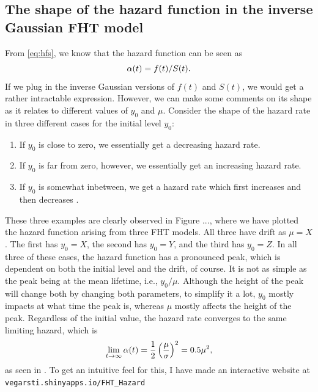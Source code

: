 \subsection{The shape of the hazard function in the inverse Gaussian FHT model}
From \eqref{eq:hfs}, we know that the hazard function can be seen as
\begin{equation*}
    \alpha(t)=f(t)/S(t).
\end{equation*}
If we plug in the inverse Gaussian versions of $f(t)$ and $S(t)$, we would get a rather intractable expression.
However, we can make some comments on its shape as it relates to different values of $y_0$ and $\mu$.
Consider the shape of the hazard rate in three different cases for the initial level $y_0$:
\begin{enumerate}
    \item
        If $y_0$ is close to zero, we essentially get a decreasing hazard rate.
    \item
        If $y_0$ is far from zero, however, we essentially get an increasing hazard rate.
    \item
        If $y_0$ is somewhat inbetween, we get a hazard rate which first increases and then decreases \citep{ABG}.
\end{enumerate}
These three examples are clearly observed in Figure ..., where we have plotted the hazard function arising from three FHT models.
All three have drift as $\mu=X$.
The first has $y_0=X$, the second has $y_0=Y$, and the third has $y_0=Z$.
In all three of these cases, the hazard function has a pronounced peak, which is dependent on both the initial level and the drift, of course. 
It is not as simple as the peak being at the mean lifetime, i.e., $y_0/\mu$.
Although the height of the peak will change both by changing both parameters, to simplify it a lot, $y_0$ mostly impacts at what time the
peak is, whereas $\mu$ mostly affects the height of the peak.
Regardless of the initial value, the hazard rate converges to the same limiting hazard, which is
\begin{equation*}
    \lim_{t\to\infty}\alpha(t)=\frac{1}{2}\left(\frac{\mu}{\sigma}\right)^2=0.5\mu^2,
\end{equation*}
as seen in \citet{ABG}. To get an intuitive feel for this, I have made an interactive website at \verb|vegarsti.shinyapps.io/FHT_Hazard|

